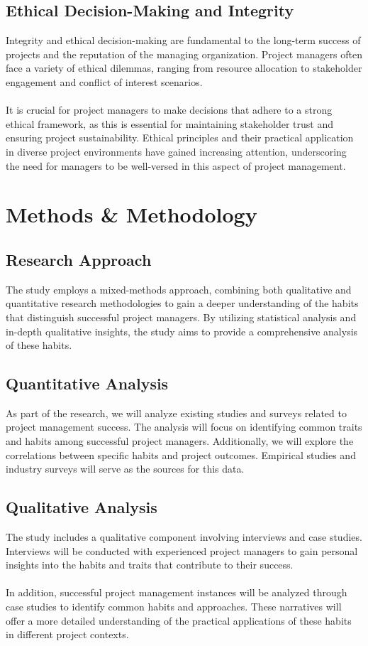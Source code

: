 \documentclass{article}
\begin{document}
\subsection{Ethical Decision-Making and Integrity}
Integrity and ethical decision-making are fundamental to the long-term success of projects and the reputation of the managing organization. Project managers often face a variety of ethical dilemmas, ranging from resource allocation to stakeholder engagement and conflict of interest scenarios. \\\\It is crucial for project managers to make decisions that adhere to a strong ethical framework, as this is essential for maintaining stakeholder trust and ensuring project sustainability. Ethical principles and their practical application in diverse project environments have gained increasing attention, underscoring the need for managers to be well-versed in this aspect of project management\cite{Project_Management_Techniques}.


\newpage
\section{Methods \& Methodology}
\subsection{Research Approach}
The study employs a mixed-methods approach, combining both qualitative and quantitative research methodologies to gain a deeper understanding of the habits that distinguish successful project managers. By utilizing statistical analysis and in-depth qualitative insights, the study aims to provide a comprehensive analysis of these habits.
\subsection{Quantitative Analysis}
As part of the research, we will analyze existing studies and surveys related to project management success. The analysis will focus on identifying common traits and habits among successful project managers. Additionally, we will explore the correlations between specific habits and project outcomes. Empirical studies and industry surveys will serve as the sources for this data.\cite{relationship_between_project_manage}
\subsection{Qualitative Analysis}
The study includes a qualitative component involving interviews and case studies. Interviews will be conducted with experienced project managers to gain personal insights into the habits and traits that contribute to their success. \\\\In addition, successful project management instances will be analyzed through case studies to identify common habits and approaches. These narratives will offer a more detailed understanding of the practical applications of these habits in different project contexts\cite{Project_Management}.
\end{document}
